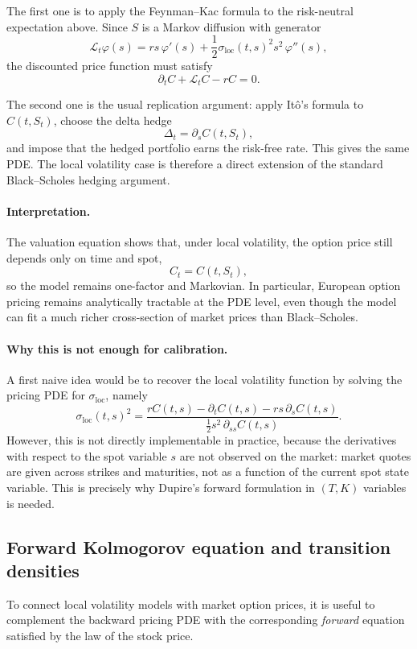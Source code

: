 \documentclass[11pt]{article}
\theoremstyle{plain}
\theoremstyle{definition}
\theoremstyle{remark}
\begin{document}
The first one is to apply the Feynman--Kac formula to the risk-neutral
expectation above.
Since \(S\) is a Markov diffusion with generator
\[
\mathcal L_t \varphi(s)
=
rs\,\varphi'(s)
+
\frac12 \sigma_{\mathrm{loc}}(t,s)^2 s^2\,\varphi''(s),
\]
the discounted price function must satisfy
\[
\partial_t C+\mathcal L_t C-rC=0.
\]

The second one is the usual replication argument:
apply It\^o's formula to \(C(t,S_t)\), choose the delta hedge
\[
\Delta_t=\partial_s C(t,S_t),
\]
and impose that the hedged portfolio earns the risk-free rate.
This gives the same PDE. The local volatility case is therefore a direct
extension of the standard Black--Scholes hedging argument. 

\paragraph{Interpretation.}
The valuation equation shows that, under local volatility, the option
price still depends only on time and spot,
\[
C_t=C(t,S_t),
\]
so the model remains one-factor and Markovian.
In particular, European option pricing remains analytically tractable at
the PDE level, even though the model can fit a much richer cross-section
of market prices than Black--Scholes. 

\paragraph{Why this is not enough for calibration.}
A first naive idea would be to recover the local volatility function by
solving the pricing PDE for \(\sigma_{\mathrm{loc}}\), namely
\[
\sigma_{\mathrm{loc}}(t,s)^2
=
\frac{
rC(t,s)-\partial_t C(t,s)-rs\,\partial_s C(t,s)
}{
\frac12 s^2\,\partial_{ss}C(t,s)
}.
\]
However, this is not directly implementable in practice, because the
derivatives with respect to the spot variable \(s\) are not observed on
the market: market quotes are given across strikes and maturities, not
as a function of the current spot state variable. This is precisely why
Dupire's forward formulation in \((T,K)\) variables is needed.  

\subsection{Forward Kolmogorov equation and transition densities}

To connect local volatility models with market option prices, it is
useful to complement the backward pricing PDE with the corresponding
\emph{forward} equation satisfied by the law of the stock price.
\end{document}
